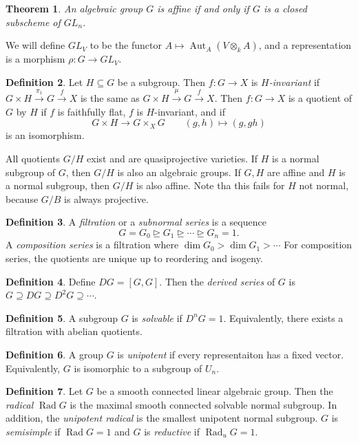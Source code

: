 \documentclass[leqno, openany]{memoir}
\newtheorem{thm}{Theorem}[section]
\theoremstyle{definition}
\newtheorem{defn}[thm]{Definition}
\theoremstyle{remark}
\theoremstyle{plain}
\theoremstyle{definition}
\theoremstyle{remark}
\newcommand{\on}[1]{\operatorname{#1}}
\DeclareMathOperator{\Aut}{Aut}
\begin{document}
\begin{thm}
    An algebraic group $G$ is affine if and only if $G$ is a closed subscheme of $GL_n$.
\end{thm}

We will define $GL_V$ to be the functor $A \mapsto \Aut_A(V \otimes_k A)$, and a representation is a morphism $\rho \colon G \to GL_V$.

\begin{defn}
    Let $H \subseteq G$ be a subgroup. Then $f \colon G \to X$ is \textit{$H$-invariant} if $G \times H \xrightarrow{\pi_1} G \xrightarrow{f} X$ is the same as $G \times H \xrightarrow{\mu} G \xrightarrow{f} X$. Then $f \colon G \to X$ is a quotient of $G$ by $H$ if $f$ is faithfully flat, $f$ is $H$-invariant, and if
    \[ G \times H \to G \times_X G \qquad (g,h) \mapsto (g, gh) \]
    is an isomorphism.
\end{defn}

All quotients $G/H$ exist and are quasiprojective varieties. If $H$ is a normal subgroup of $G$, then $G/H$ is also an algebraic groups. If $G, H$ are affine and $H$ is a normal subgroup, then $G/H$ is also affine. Note tha this fails for $H$ not normal, because $G/B$ is always projective.

\begin{defn}
    A \textit{filtration} or a \textit{subnormal series} is a sequence
    \[ G = G_0 \trianglerighteq G_1 \trianglerighteq \cdots \trianglerighteq G_n = 1. \]
    A \textit{composition series} is a filtration where $\dim G_0 > \dim G_1 > \cdots$ For composition series, the quotients are unique up to reordering and isogeny.
\end{defn}

\begin{defn}
    Define $DG = [G,G]$. Then the \textit{derived series} of $G$ is $G \supseteq DG \supseteq D^2 G \supseteq \cdots$.
\end{defn}

\begin{defn}
    A subgroup $G$ is \textit{solvable} if $D^n G = 1$. Equivalently, there exists a filtration with abelian quotients.
\end{defn}

\begin{defn}
    A group $G$ is \textit{unipotent} if every representaiton has a fixed vector. Equivalently, $G$ is isomorphic to a subgroup of $U_n$.
\end{defn}

\begin{defn}
    Let $G$ be a smooth connected linear algebraic group. Then the \textit{radical} $\on{Rad} G$ is the maximal smooth connected solvable normal subgroup. In addition, the \textit{unipotent radical} is the smallest unipotent normal subgroup. $G$ is \textit{semisimple} if $\on{Rad} G = 1$ and $G$ is \textit{reductive} if $\on{Rad}_u G = 1$.
\end{defn}
\end{document}
